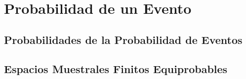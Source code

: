 \section{Probabilidad de un Evento}
    \lipsum
    \subsection{Probabilidades de la Probabilidad de Eventos}
        \lipsum[1]
    \subsection{Espacios Muestrales Finitos Equiprobables}
        \lipsum[1]

